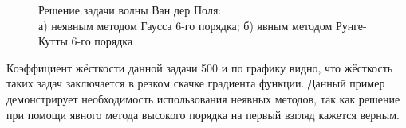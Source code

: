 %     

\begin{figure}
    \begin{subfigure}[t]{0.45\linewidth}
        \centering
        
        \caption{}
    \end{subfigure}
    \hfill
    \begin{subfigure}[t]{0.45\linewidth}
        \centering
        
        \caption{}
    \end{subfigure}
    \hfill
    \caption{Решение задачи волны Ван дер Поля:\\ а) неявным методом Гаусса 6-го порядка; б) явным методом Рунге-Кутты 6-го порядка}
    \label{fig:bomb}
\end{figure}

Коэффициент жёсткости данной задачи 500 и по графику видно, что жёсткость таких задач заключается в резком скачке градиента функции.
Данный пример демонстрирует необходимость использования неявных методов, так как решение при помощи явного метода высокого порядка
на первый взгляд кажется верным.

